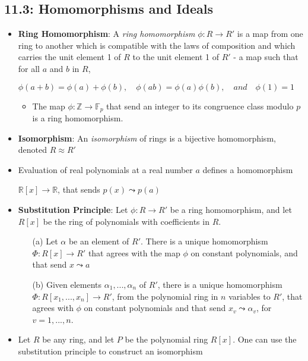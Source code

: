 \documentclass[12pt]{article}
\begin{document}
\subsection*{11.3: Homomorphisms and Ideals}
\begin{itemize}
  \item \textbf{Ring Homomorphism}: A \textit{ring homomorphism} $\phi: R \to R'$ is a map from one ring to another which is compatible with the laws of composition and which carries the unit element 1 of $R$ to the unit element 1 of $R'$ - a map such that for all $a$ and $b$ in $R$,
  \begin{center}
    $\phi(a + b) = \phi(a) + \phi(b), \quad \phi(ab) = \phi(a)\phi(b), \quad and \quad \phi(1) = 1$
  \end{center}
  \begin{itemize}
    \item The map $\phi: \mathbb{Z} \to \mathbb{F}_p$ that send an integer to its congruence class modulo $p$ is a ring homomorphism.
  \end{itemize}
  \item \textbf{Isomorphism}: An \textit{isomorphism} of rings is a bijective homomorphism, denoted $R \approx R'$
  \item Evaluation of real polynomials at a real number $a$ defines a homomorphism
  \begin{center}
    $\mathbb{R}[x] \to \mathbb{R}$, \quad that sends \quad $p(x) \leadsto p(a)$
  \end{center}
  \item \textbf{Substitution Principle}: Let $\phi: R \to R'$ be a ring homomorphism, and let $R[x]$ be the ring of polynomials with coefficients in $R$.
  \begin{enumerate}
    \item[(a)] Let $\alpha$ be an element of $R'$. There is a unique homomorphism $\Phi: R[x] \to R'$ that agrees with the map $\phi$ on constant polynomials, and that send $x \leadsto a$
    \item[(b)] Given elements $\alpha_1, ..., \alpha_n$ of $R'$, there is a unique homomorphism $\Phi: R[x_1, ..., x_n] \to R'$, from the polynomial ring in $n$ variables to $R'$, that agrees with $\phi$ on constant polynomials and that send $x_v \leadsto \alpha_v$, for $v = 1, ..., n$.
  \end{enumerate}
  \item Let $R$ be any ring, and let $P$ be the polynomial ring $R[x]$. One can use the substitution principle to construct an isomorphism

\end{itemize}
\end{document}
